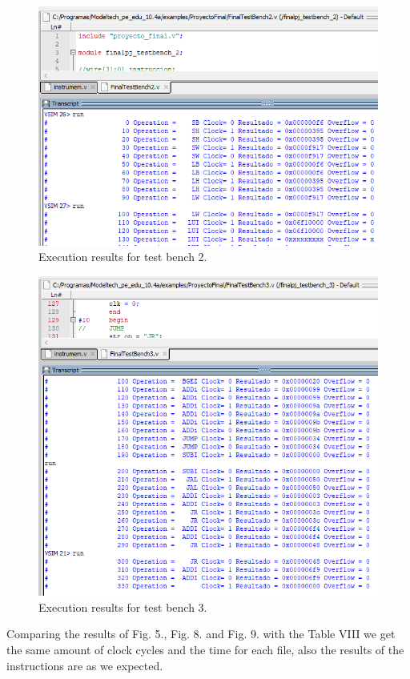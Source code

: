 \documentclass[conference]{IEEEtran}
\begin{document}
\begin{figure}[h]
\includegraphics[scale=0.5]{ModelSim_testbench2_clock_cycles.png}
\caption{Execution results for test bench 2.}
\label{result2}
\end{figure}

\begin{figure}[h]
\includegraphics[scale=0.5]{ModelSim_testbench3_clock_cycles.png}
\caption{Execution results for test bench 3.}
\label{result3}
\end{figure}

Comparing the results of Fig. 5., Fig. 8. and Fig. 9. with the Table VIII we get the same amount
of clock cycles and the time for each file, also the results of the instructions are as we expected.
 
\end{document}
